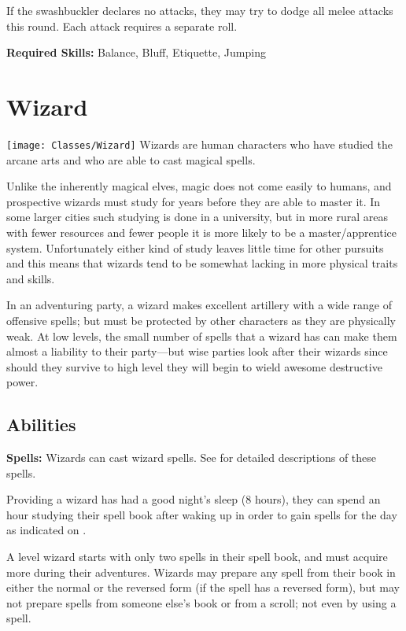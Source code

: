 \begin{multicols*}{2}
If the swashbuckler declares no attacks, they may try to dodge all melee attacks this round. Each attack requires a separate roll.

\textbf{Required Skills:} Balance, Bluff, Etiquette, Jumping

\section{Wizard}\label{class:Wizard}
\texttt{[image: Classes/Wizard]}
Wizards are human characters who have studied the arcane arts and who are able to cast magical spells.

Unlike the inherently magical elves, magic does not come easily to humans, and prospective wizards must study for years before they are able to master it. In some larger cities such studying is done in a university, but in more rural areas with fewer resources and fewer people it is more likely to be a master/apprentice system. Unfortunately either kind of study leaves little time for other pursuits and this means that wizards tend to be somewhat lacking in more physical traits and skills.

In an adventuring party, a wizard makes excellent artillery with a wide range of offensive spells; but must be protected by other characters as they are physically weak. At low levels, the small number of spells that a wizard has can make them almost a liability to their party—but wise parties look after their wizards since should they survive to high level they will begin to wield awesome destructive power.

\subsection{Abilities}
\textbf{Spells:} Wizards can cast wizard spells. See  for detailed descriptions of these spells.

Providing a wizard has had a good night’s sleep (8 hours), they can spend an hour studying their spell book after waking up in order to gain spells for the day as indicated on .

A  level wizard starts with only two spells in their spell book, and must acquire more during their adventures. Wizards may prepare any spell from their book in either the normal or the reversed form (if the spell has a reversed form), but may not prepare spells from someone else’s book or from a scroll; not even by using a  spell.


\end{multicols*}
